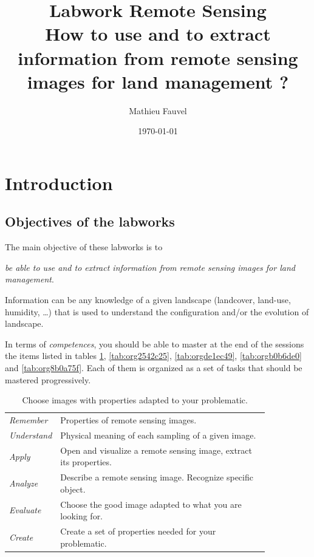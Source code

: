 \documentclass[a4paper,11pt,DIV=18]{scrartcl}
\author{Mathieu Fauvel}
\date{\today}
\title{Labwork Remote Sensing\\\medskip
\large How to use and to extract information from remote sensing images for land management ?}
\begin{document}
\maketitle
\setcounter{tocdepth}{2}
\tableofcontents

\section{Introduction}
\label{sec:org25a166b}
\subsection{Objectives of the labworks}
\label{sec:org21965e3}
The main objective of these labworks is to
\begin{center}
\emph{be able to  use and to extract information from  remote sensing images
for land management}.
\end{center}
Information  can be  any knowledge  of a  given landscape  (landcover,
land-use, humidity, \ldots{})  that is used to understand the configuration
and/or the evolution of landscape.

In terms of  \emph{competences}, you should be  able to master at  the end of
the sessions  the items listed in  tables \ref{tab:orgbf1ef19}, \ref{tab:org2542c25}, \ref{tab:orgde1ec49},  \ref{tab:orgb0b6de0} and \ref{tab:org8b0a75f}.
Each of them  is organized as a  set of tasks that  should be mastered
progressively.

\begin{table}[htbp]
\caption{\label{tab:orgbf1ef19}
Choose images with properties adapted to your problematic.}
\centering
\begin{tabular}{lp{0.85\linewidth}}
\toprule
\emph{Remember} & Properties of remote sensing images.\\
\emph{Understand} & Physical meaning of each sampling of a given image.\\
\emph{Apply} & Open and visualize a remote sensing image, extract its properties.\\
\emph{Analyze} & Describe a remote sensing image. Recognize specific object.\\
\emph{Evaluate} & Choose the good image adapted to what you are looking for.\\
\emph{Create} & Create a set of properties needed for your problematic.\\
\bottomrule
\end{tabular}
\end{table}
\end{document}

